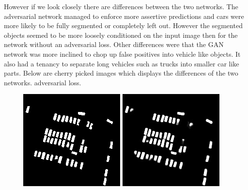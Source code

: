 \documentclass{kththesis}
\begin{document}
However if we look closely there are differences between the two networks. The adversarial network managed to enforce more assertive predictions and cars were more likely to be fully segmented or completely left out. However the segmented objects seemed to be more loosely conditioned on the input image then for the network without an adversarial loss. Other differences were that the GAN network was more inclined to chop up false positives into vehicle like objects. It also had a tenancy to separate long vehicles such as trucks into smaller car like parts. Below are cherry picked images which displays the differences of the two networks. adversarial loss.
\begin{figure}[H]
  \includegraphics[width=\linewidth]{gan_vs_class/label_1}
\endminipage\hfill
{}
  \includegraphics[width=\linewidth]{gan_vs_class/class_1}

\end{figure}
\end{document}
